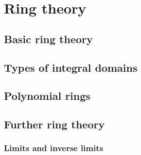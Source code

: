 \part{Ring theory}

\chapter{Basic ring theory}
    
    
    
    
    
\chapter{Types of integral domains}
    
    
    
    
    
    
    

\chapter{Polynomial rings}
    
    
    

\chapter{Further ring theory}
    
    \section{Limits and inverse limits}
